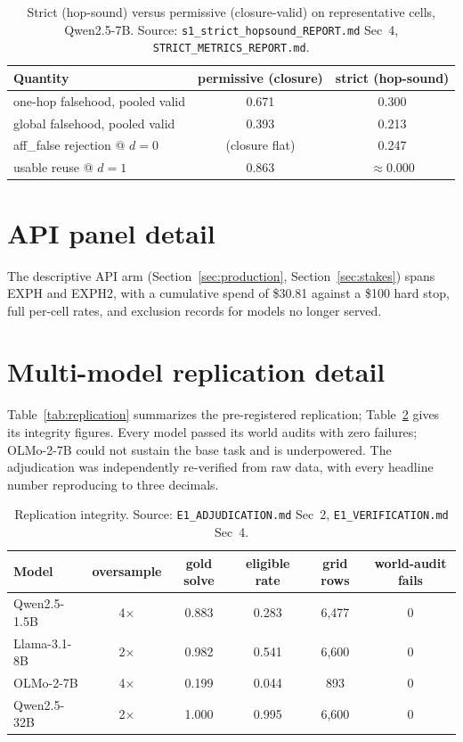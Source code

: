 \begin{table}[h]
\centering
\caption{Strict (hop-sound) versus permissive (closure-valid) on
representative cells, Qwen2.5-7B. Source:
\texttt{s1\_strict\_hopsound\_REPORT.md} Sec~4,
\texttt{STRICT\_METRICS\_REPORT.md}.}
\label{tab:strict}
\small
\begin{tabular}{@{}lcc@{}}
\toprule
Quantity & permissive (closure) & strict (hop-sound) \\
\midrule
one-hop falsehood, pooled valid & 0.671 & 0.300 \\
global falsehood, pooled valid & 0.393 & 0.213 \\
aff\_false rejection @ $d{=}0$ & (closure flat) & 0.247 \\
usable reuse @ $d{=}1$ & 0.863 & $\approx 0.000$ \\
\bottomrule
\end{tabular}
\end{table}

\section{API panel detail}
\label{app:api}

The descriptive API arm (Section~\ref{sec:production},
Section~\ref{sec:stakes}) spans EXPH and EXPH2, with a cumulative spend of
\$30.81 against a \$100 hard stop, full per-cell rates, and exclusion
records for models no longer served.

\section{Multi-model replication detail}
\label{app:e1}

Table~\ref{tab:replication} summarizes the pre-registered replication;
Table~\ref{tab:e1integrity} gives its integrity figures. Every model passed
its world audits with zero failures; OLMo-2-7B could not sustain the base
task and is underpowered. The adjudication was independently re-verified
from raw data, with every headline number reproducing to three decimals.

\begin{table}[h]
\centering
\caption{Replication integrity. Source: \texttt{E1\_ADJUDICATION.md} Sec~2,
\texttt{E1\_VERIFICATION.md} Sec~4.}
\label{tab:e1integrity}
\small
\begin{tabular}{@{}lccccc@{}}
\toprule
Model & oversample & gold solve & eligible rate & grid rows & world-audit fails \\
\midrule
Qwen2.5-1.5B & 4$\times$ & 0.883 & 0.283 & 6{,}477 & 0 \\
Llama-3.1-8B & 2$\times$ & 0.982 & 0.541 & 6{,}600 & 0 \\
OLMo-2-7B & 4$\times$ & 0.199 & 0.044 & 893 & 0 \\
Qwen2.5-32B & 2$\times$ & 1.000 & 0.995 & 6{,}600 & 0 \\
\bottomrule
\end{tabular}
\end{table}

